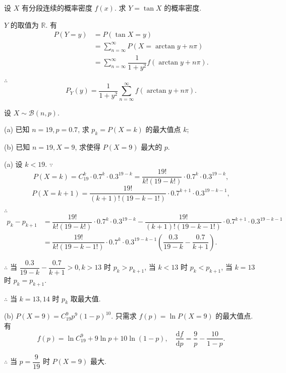 \documentclass[color=black,device=normal,lang=cn]{elegantnote}
\numberwithin{equation}{section}
\theoremstyle{plain}
\numberwithin{exercise}{exsection}
\begin{document}
\addtocounter{exercise}{2}
\begin{exercise}[c]%
    设 $X$ 有分段连续的概率密度 $f(x)$. 求 $Y=\tan X$ 的概率密度.
\end{exercise}
\begin{solution}
    $Y$ 的取值为 $\mathbb{R}$. 有
    \begin{align*}
        P(Y=y) & =P(\tan X=y) \\
        & =\sum\limits_{n=\infty}^\infty P(X=\arctan y+n\pi) \\
        & =\sum\limits_{n=\infty}^\infty\dfrac{1}{1+y^2}f(\arctan y+n\pi).
    \end{align*}

    $\therefore$
    \[P_Y(y)=\dfrac{1}{1+y^2}\sum\limits_{n=\infty}^\infty f(\arctan y+n\pi).\]
\end{solution}
\newpage
\begin{exercise}%
    设 $X\sim\mathcal{B}(n,p)$.

    (a) 已知 $n=19,p=0.7$, 求 $p_k=P(X=k)$ 的最大值点 $k$;

    (b) 已知 $n=19,X=9$, 求使得 $P(X=9)$ 最大的 $p$.
\end{exercise}
\begin{solution}
    (a) 设 $k<19$. $\because$
    \[P(X=k)=C_{19}^k\cdot0.7^k\cdot0.3^{19-k}=\dfrac{19!}{k!(19-k!)}\cdot0.7^k\cdot0.3^{19-k},\]
    \[P(X=k+1)=\dfrac{19!}{(k+1)!(19-k-1!)}\cdot0.7^{k+1}\cdot0.3^{19-k-1},\]

    $\therefore$
    \begin{align*}
        p_k-p_{k+1} & =\dfrac{19!}{k!(19-k!)}\cdot0.7^k\cdot0.3^{19-k}-\dfrac{19!}{(k+1)!(19-k-1!)}\cdot0.7^{k+1}\cdot0.3^{19-k-1} \\
        & =\dfrac{19!}{k!(19-k-1!)}\cdot0.7^k\cdot0.3^{19-k-1}\left(\dfrac{0.3}{19-k}-\dfrac{0.7}{k+1}\right).
    \end{align*}

    $\therefore$ 当 $\dfrac{0.3}{19-k}-\dfrac{0.7}{k+1}>0,k>13$ 时 $p_k>p_{k+1}$, 当 $k<13$ 时 $p_k<p_{k+1}$, 当 $k=13$ 时 $p_k=p_{k+1}$.

    $\therefore$ 当 $k=13,14$ 时 $p_k$ 取最大值.

    (b) $P(X=9)=C_{19}^9p^9(1-p)^{10}$. 只需求 $f(p)=\ln P(X=9)$ 的最大值点. 有
    \[f(p)=\ln C_{19}^9+9\ln p+10\ln(1-p),\quad\dfrac{\mathrm{d}f}{\mathrm{d}p}=\dfrac{9}{p}-\dfrac{10}{1-p}.\]

    $\therefore$ 当 $p=\dfrac{9}{19}$ 时 $P(X=9)$ 最大.
\end{solution}
\end{document}
